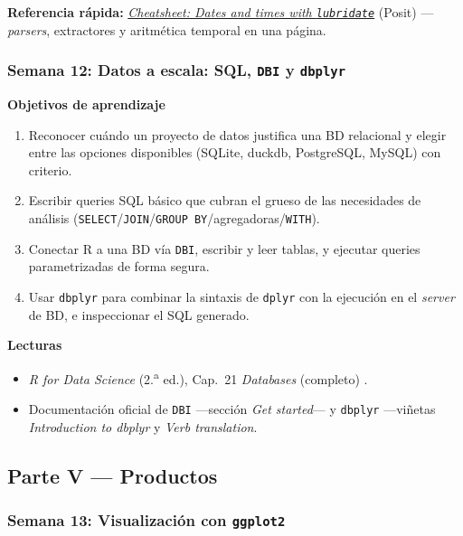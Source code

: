 \documentclass[11pt,letterpaper]{article}
\newcommand{\semana}[2]{%
  \subsubsection*{\color{main}Semana #1: #2}%
}
\newcommand{\cheatsheet}[2]{%
  \href{https://rstudio.github.io/cheatsheets/#1.pdf}{\textit{Cheatsheet: #2}}%
}
\begin{document}
\medskip
\noindent\textbf{Referencia rápida:} \cheatsheet{lubridate}{Dates and times with \texttt{lubridate}} (Posit) ---\textit{parsers}, extractores y aritmética temporal en una página.

\semana{12}{Datos a escala: SQL, \texttt{DBI} y \texttt{dbplyr}}

\medskip
\noindent\textbf{Objetivos de aprendizaje}
\begin{enumerate}[leftmargin=*, itemsep=1pt]
    \item Reconocer cuándo un proyecto de datos justifica una BD relacional y elegir entre las opciones disponibles (SQLite, duckdb, PostgreSQL, MySQL) con criterio.
    \item Escribir queries SQL básico que cubran el grueso de las necesidades de análisis (\texttt{SELECT}/\texttt{JOIN}/\texttt{GROUP BY}/agregadoras/\texttt{WITH}).
    \item Conectar R a una BD vía \texttt{DBI}, escribir y leer tablas, y ejecutar queries parametrizadas de forma segura.
    \item Usar \texttt{dbplyr} para combinar la sintaxis de \texttt{dplyr} con la ejecución en el \textit{server} de BD, e inspeccionar el SQL generado.
\end{enumerate}

\medskip
\noindent\textbf{Lecturas}
\begin{itemize}[leftmargin=*, itemsep=1pt]
    \item \textit{R for Data Science} (2.\textsuperscript{a} ed.), Cap.\ 21 \textit{Databases} (completo) \cite{wickham2023r4ds}.
    \item Documentación oficial de \texttt{DBI} ---sección \textit{Get started}--- y \texttt{dbplyr} ---viñetas \textit{Introduction to dbplyr} y \textit{Verb translation}.
\end{itemize}

\subsection*{\color{main}Parte V --- Productos}

\semana{13}{Visualización con \texttt{ggplot2}}
\end{document}
